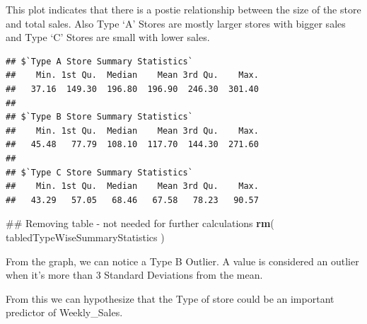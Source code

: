 \documentclass[]{article}
\newenvironment{Shaded}{\begin{snugshade}}{\end{snugshade}}
\newcommand{\KeywordTok}[1]{\textcolor[rgb]{0.13,0.29,0.53}{\textbf{{#1}}}}
\newcommand{\DecValTok}[1]{\textcolor[rgb]{0.00,0.00,0.81}{{#1}}}
\newcommand{\StringTok}[1]{\textcolor[rgb]{0.31,0.60,0.02}{{#1}}}
\newcommand{\NormalTok}[1]{{#1}}
\begin{document}
This plot indicates that there is a postie relationship between the size
of the store and total sales. Also Type `A' Stores are mostly larger
stores with bigger sales and Type `C' Stores are small with lower sales.

\begin{Shaded}
\end{Shaded}

\begin{verbatim}
## $`Type A Store Summary Statistics`
##    Min. 1st Qu.  Median    Mean 3rd Qu.    Max. 
##   37.16  149.30  196.80  196.90  246.30  301.40 
## 
## $`Type B Store Summary Statistics`
##    Min. 1st Qu.  Median    Mean 3rd Qu.    Max. 
##   45.48   77.79  108.10  117.70  144.30  271.60 
## 
## $`Type C Store Summary Statistics`
##    Min. 1st Qu.  Median    Mean 3rd Qu.    Max. 
##   43.29   57.05   68.46   67.58   78.23   90.57
\end{verbatim}

\begin{Shaded}
\begin{Highlighting}[]
\NormalTok{## Removing table - not needed for further calculations}
\KeywordTok{rm}\NormalTok{( tabledTypeWiseSummaryStatistics )}
\end{Highlighting}
\end{Shaded}

From the graph, we can notice a Type B Outlier. A value is considered an
outlier when it's more than 3 Standard Deviations from the mean.

From this we can hypothesize that the Type of store could be an
important predictor of Weekly\_Sales.
\end{document}
